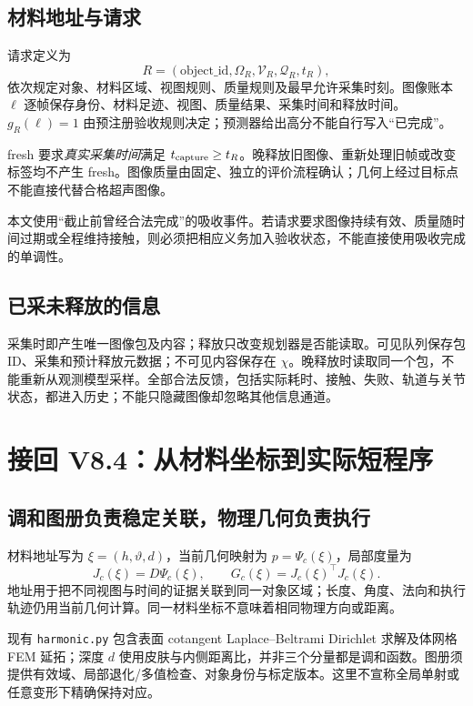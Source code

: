 \documentclass[11pt,a4paper,fontset=fandol]{ctexart}
\theoremstyle{definition}\newtheorem{definition}[theorem]{定义}
\theoremstyle{remark}\newtheorem{remark}[theorem]{说明}
\numberwithin{equation}{section}
\begin{document}
\subsection{材料地址与请求}
请求定义为
\begin{equation}
 R=(\mathrm{object\_id},\Omega_R,\mathcal V_R,\mathcal Q_R,t_R),
 \label{eq:request}
\end{equation}
依次规定对象、材料区域、视图规则、质量规则及最早允许采集时刻。图像账本 $\ell$ 逐帧保存身份、材料足迹、视图、质量结果、采集时间和释放时间。$g_R(\ell)=1$ 由预注册验收规则决定；预测器给出高分不能自行写入“已完成”。

fresh 要求\emph{真实采集时间}满足 $t_{\rm capture}\ge t_R$。晚释放旧图像、重新处理旧帧或改变标签均不产生 fresh。图像质量由固定、独立的评价流程确认；几何上经过目标点不能直接代替合格超声图像。

本文使用“截止前曾经合法完成”的吸收事件。若请求要求图像持续有效、质量随时间过期或全程维持接触，则必须把相应义务加入验收状态，不能直接使用吸收完成的单调性。

\subsection{已采未释放的信息}
采集时即产生唯一图像包及内容；释放只改变规划器是否能读取。可见队列保存包 ID、采集和预计释放元数据；不可见内容保存在 $\chi$。晚释放时读取同一个包，不能重新从观测模型采样。全部合法反馈，包括实际耗时、接触、失败、轨道与关节状态，都进入历史；不能只隐藏图像却忽略其他信息通道。

\section{接回 V8.4：从材料坐标到实际短程序}
\label{sec:system}
\subsection{调和图册负责稳定关联，物理几何负责执行}
材料地址写为 $\xi=(h,\vartheta,d)$，当前几何映射为 $p=\Psi_c(\xi)$，局部度量为
\begin{equation}
 J_c(\xi)=D\Psi_c(\xi),\qquad G_c(\xi)=J_c(\xi)^\top J_c(\xi).
 \label{eq:atlas}
\end{equation}
地址用于把不同视图与时间的证据关联到同一对象区域；长度、角度、法向和执行轨迹仍用当前几何计算。同一材料坐标不意味着相同物理方向或距离。

现有 \texttt{harmonic.py} 包含表面 cotangent Laplace--Beltrami Dirichlet 求解及体网格 FEM 延拓；深度 $d$ 使用皮肤与内侧距离比，并非三个分量都是调和函数\cite{codeharmonic}。图册须提供有效域、局部退化/多值检查、对象身份与标定版本。这里不宣称全局单射或任意变形下精确保持对应。
\end{document}
